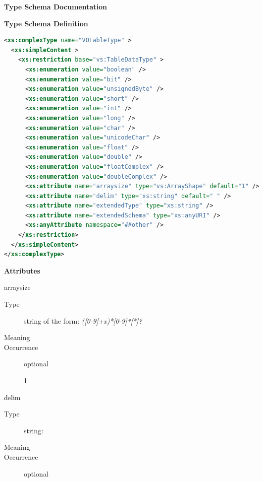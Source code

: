 \documentclass[11pt,a4paper]{ivoa}
\begin{document}
\begin{generated}
\begingroup
      	\renewcommand*\descriptionlabel[1]{%
      	\hbox to 5.5em{\emph{#1}\hfil}}\vspace{2ex}\noindent\textbf{ Type Schema Documentation}


\vspace{1ex}\noindent\textbf{ Type Schema Definition}

\begin{lstlisting}[language=XML,basicstyle=\footnotesize]
<xs:complexType name="VOTableType" >
  <xs:simpleContent >
    <xs:restriction base="vs:TableDataType" >
      <xs:enumeration value="boolean" />
      <xs:enumeration value="bit" />
      <xs:enumeration value="unsignedByte" />
      <xs:enumeration value="short" />
      <xs:enumeration value="int" />
      <xs:enumeration value="long" />
      <xs:enumeration value="char" />
      <xs:enumeration value="unicodeChar" />
      <xs:enumeration value="float" />
      <xs:enumeration value="double" />
      <xs:enumeration value="floatComplex" />
      <xs:enumeration value="doubleComplex" />
      <xs:attribute name="arraysize" type="vs:ArrayShape" default="1" />
      <xs:attribute name="delim" type="xs:string" default=" " />
      <xs:attribute name="extendedType" type="xs:string" />
      <xs:attribute name="extendedSchema" type="xs:anyURI" />
      <xs:anyAttribute namespace="##other" />
    </xs:restriction>
  </xs:simpleContent>
</xs:complexType>
\end{lstlisting}

\vspace{0.5ex}\noindent\textbf{ Attributes}

\begingroup\small\begin{bigdescription}
\item[arraysize]
\begin{description}
\item[Type] string of the form: \emph{([0-9]+x)*[0-9]*[*]?}
\item[Meaning] 
\item[Occurrence] optional

1
\end{description}
\item[delim]
\begin{description}
\item[Type] string: 
\item[Meaning] 
\item[Occurrence] optional
 

\end{description}
\end{bigdescription}
\end{generated}
\end{document}
